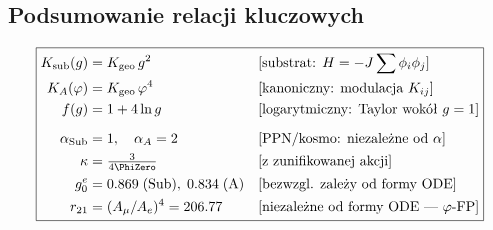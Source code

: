 \subsection{Podsumowanie relacji kluczowych}

\begin{equation}\label{eq:dictionary-key}
\boxed{
\begin{aligned}
  K_{\mathrm{sub}}(g) &= K_{\mathrm{geo}}\,g^2
  & &\text{[substrat: } H = -J\sum \phi_i\phi_j]\\
  K_A(\varphi) &= K_{\mathrm{geo}}\,\varphi^4
  & &\text{[kanoniczny: modulacja } K_{ij}]\\
  f(g) &= 1 + 4\ln g
  & &\text{[logarytmiczny: Taylor wokół } g=1]\\[6pt]
  \alpha_{\mathrm{Sub}} &= 1, \quad \alpha_A = 2
  & &\text{[PPN/kosmo: niezależne od $\alpha$]}\\
  \kappa &= \tfrac{3}{4\PhiZero}
  & &\text{[z zunifikowanej akcji]}\\
  g_0^e &= 0.869\;\text{(Sub)},\; 0.834\;\text{(A)}
  & &\text{[bezwzgl. zależy od formy ODE]}\\
  r_{21} &= (A_\mu/A_e)^4 = 206.77
  & &\text{[niezależne od formy ODE — $\varphi$-FP]}
\end{aligned}
}
\end{equation}
